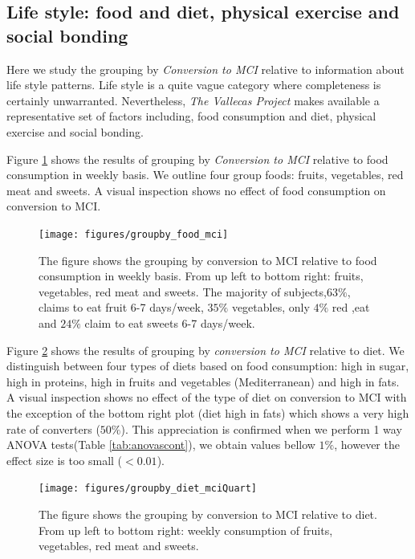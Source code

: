 \documentclass[11pt]{article}
\theoremstyle{definition}
\theoremstyle{remark}
\begin{document}
\subsection{Life style: food and diet, physical exercise and social bonding}

Here we study the grouping by \emph{Conversion to MCI} relative to information about life style patterns. Life style is a quite vague category where completeness is certainly unwarranted. Nevertheless, \emph{The Vallecas Project} makes available a representative set of factors including, food consumption and diet, physical exercise and social bonding.

Figure \ref{fig:groupby_food_mci} shows the results of grouping by \emph{Conversion to MCI} relative to food consumption in weekly basis. We outline four group foods: fruits, vegetables, red meat and sweets. A visual inspection shows no effect of food consumption on conversion to MCI. %

\begin{figure}[H]
        \centering
        \texttt{[image: figures/groupby\_food\_mci]}
        \caption{The figure shows the grouping by conversion to MCI relative to food consumption in weekly basis. From up left to bottom right: fruits, vegetables, red meat and sweets. The majority of subjects,$63\%$, claims to eat fruit 6-7 days/week, $35\%$ vegetables, only $4\%$ red ,eat and $24\%$ claim to eat sweets 6-7 days/week.} 
        \label{fig:groupby_food_mci}
\end{figure}

Figure \ref{fig:groupby_diet_mciQuart} shows the results of grouping by \emph{conversion to MCI} relative to diet. We distinguish between four types of diets based on food consumption: high in sugar, high in proteins, high in fruits and vegetables (Mediterranean) and high in fats. A visual inspection shows no effect of the type of diet on conversion to MCI with the exception of the bottom right plot (diet high in fats) which shows a very high rate of converters ($50\%$). This appreciation is confirmed when we perform 1 way ANOVA tests(Table \ref{tab:anovascont}), we obtain values bellow $1\%$, however the effect size is too small ($<0.01$). 
\begin{figure}[H]
        \centering
        \texttt{[image: figures/groupby\_diet\_mciQuart]}
        \caption{The figure shows the grouping by conversion to MCI relative to diet. From up left to bottom right: weekly consumption of fruits, vegetables, red meat and sweets.} 
        \label{fig:groupby_diet_mciQuart}
\end{figure}
\end{document}
